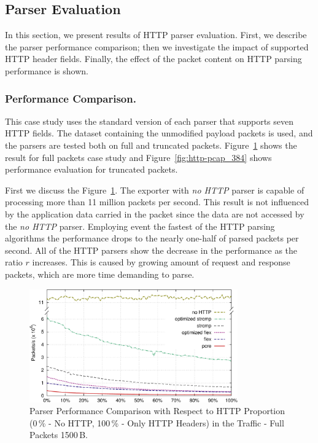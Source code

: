 \subsection{Parser Evaluation} \label{subsec:http-perform_evaluation}

In this section, we present results of HTTP parser evaluation. First, we describe the parser performance comparison; then we investigate the impact of supported HTTP header fields. Finally, the effect of the packet content on HTTP parsing performance is shown.

\subsubsection*{Performance Comparison.}

This case study uses the standard version of each parser that supports seven HTTP fields. The dataset containing the unmodified payload packets is used, and the parsers are tested both on full and truncated packets. Figure~\ref{fig:http-pcap_1500} shows the result for full packets case study and Figure~\ref{fig:http-pcap_384} shows performance evaluation for truncated packets.

First we discuss the Figure~\ref{fig:http-pcap_1500}. The exporter with \emph{no HTTP} parser is capable of processing more than 11 million packets per second. This result is not influenced by the application data carried in the packet since the data are not accessed by the \emph{no HTTP} parser. Employing event the fastest of the HTTP parsing algorithms the performance drops to the nearly one-half of parsed packets per second. All of the HTTP parsers show the decrease in the performance as the ratio $r$ increases. This is caused by growing amount of request and response packets, which are more time demanding to parse.

\begin{figure}[tb]
        \centering
        \includegraphics[width=0.8\textwidth]{figures/paper-http/1500_pcap_norm_1}
        \caption{Parser Performance Comparison with Respect to HTTP Proportion (0\,\% - No HTTP, 100\,\% - Only HTTP Headers) in the Traffic - Full Packets 1500\,B.}
        \label{fig:http-pcap_1500}
\end{figure}

